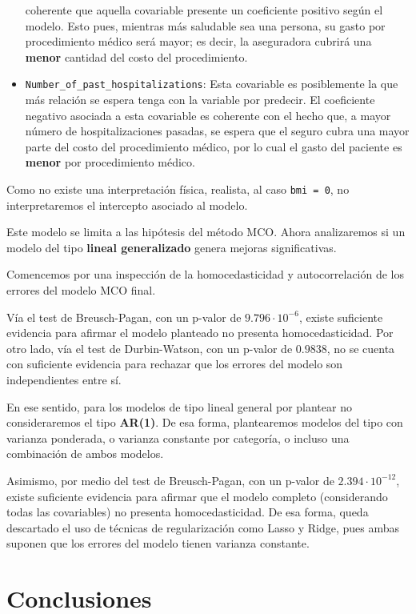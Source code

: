 \documentclass[
]{article}
\begin{document}
\begin{itemize}
  coherente que aquella covariable presente un coeficiente positivo
  según el modelo. Esto pues, mientras más saludable sea una persona, su
  gasto por procedimiento médico será mayor; es decir, la aseguradora
  cubrirá una \textbf{menor} cantidad del costo del procedimiento.
\item
  \texttt{Number\_of\_past\_hospitalizations}: Esta covariable es
  posiblemente la que más relación se espera tenga con la variable por
  predecir. El coeficiente negativo asociada a esta covariable es
  coherente con el hecho que, a mayor número de hospitalizaciones
  pasadas, se espera que el seguro cubra una mayor parte del costo del
  procedimiento médico, por lo cual el gasto del paciente es
  \textbf{menor} por procedimiento médico.
\end{itemize}

Como no existe una interpretación física, realista, al caso
\texttt{bmi\ =\ 0}, no interpretaremos el intercepto asociado al modelo.

Este modelo se limita a las hipótesis del método MCO. Ahora analizaremos
si un modelo del tipo \textbf{lineal generalizado} genera mejoras
significativas.

Comencemos por una inspección de la homocedasticidad y autocorrelación
de los errores del modelo MCO final.

Vía el test de Breusch-Pagan, con un p-valor de \(9.796 \cdot 10^{-6}\),
existe suficiente evidencia para afirmar el modelo planteado no presenta
homocedasticidad. Por otro lado, vía el test de Durbin-Watson, con un
p-valor de \(0.9838\), no se cuenta con suficiente evidencia para
rechazar que los errores del modelo son independientes entre sí.

En ese sentido, para los modelos de tipo lineal general por plantear no
consideraremos el tipo \textbf{AR(1)}. De esa forma, plantearemos
modelos del tipo con varianza ponderada, o varianza constante por
categoría, o incluso una combinación de ambos modelos.

Asimismo, por medio del test de Breusch-Pagan, con un p-valor de
\(2.394 \cdot 10^{-12}\), existe suficiente evidencia para afirmar que
el modelo completo (considerando todas las covariables) no presenta
homocedasticidad. De esa forma, queda descartado el uso de técnicas de
regularización como Lasso y Ridge, pues ambas suponen que los errores
del modelo tienen varianza constante.

\section{Conclusiones}
\end{document}
